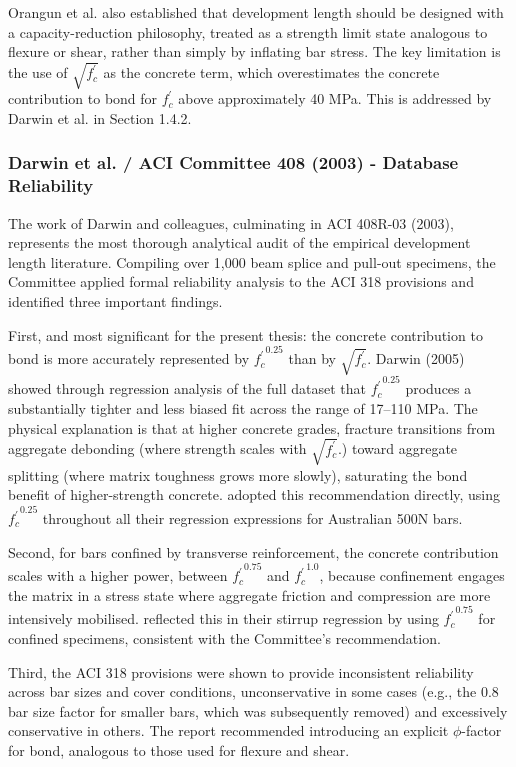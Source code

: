 Orangun et al. also established that development length should be designed with a capacity-reduction philosophy, treated as a strength limit state analogous to flexure or shear, rather than simply by inflating bar stress. The key limitation is the use of $\sqrt{f_{c}^{\prime }}$ as the concrete term, which overestimates the concrete contribution to bond for $f_{c}^{\prime }$ above approximately 40 MPa. This is addressed by Darwin et al. in Section 1.4.2.

\subsubsection{Darwin et al. / ACI Committee 408 (2003) - Database Reliability }
The work of Darwin and colleagues, culminating in ACI 408R-03 (2003), represents the most thorough analytical audit of the empirical development length literature. Compiling over 1,000 beam splice and pull-out specimens, the Committee applied formal reliability analysis to the ACI 318 provisions and identified three important findings.

First, and most significant for the present thesis: the concrete contribution to bond is more accurately represented by ${f_{c}^{\prime }}^{0.25}$  than by $\sqrt{f_{c}^{\prime }}$. Darwin (2005) showed through regression analysis of the full dataset that ${f_{c}^{\prime }}^{0.25}$ produces a substantially tighter and less biased fit across the range of 17–110 MPa. The physical explanation is that at higher concrete grades, fracture transitions from aggregate debonding (where strength scales with $\sqrt{f_{c}^{\prime }}$.) toward aggregate splitting (where matrix toughness grows more slowly), saturating the bond benefit of higher-strength concrete. \textcite{liTensileBondAnchorage2012} adopted this recommendation directly, using ${f_{c}^{\prime }}^{0.25}$ throughout all their regression expressions for Australian 500N bars.

Second, for bars confined by transverse reinforcement, the concrete contribution scales with a higher power, between ${f_{c}^{\prime }}^{0.75}$ and ${f_{c}^{\prime }}^{1.0}$,  because confinement engages the matrix in a stress state where aggregate friction and compression are more intensively mobilised. \textcite{liTensileBondAnchorage2012} reflected this in their stirrup regression by using ${f_{c}^{\prime }}^{0.75}$ for confined specimens, consistent with the Committee's recommendation.

Third, the ACI 318 provisions were shown to provide inconsistent reliability across bar sizes and cover conditions, unconservative in some cases (e.g., the 0.8 bar size factor for smaller bars, which was subsequently removed) and excessively conservative in others. The report recommended introducing an explicit $\phi$-factor for bond, analogous to those used for flexure and shear. 

